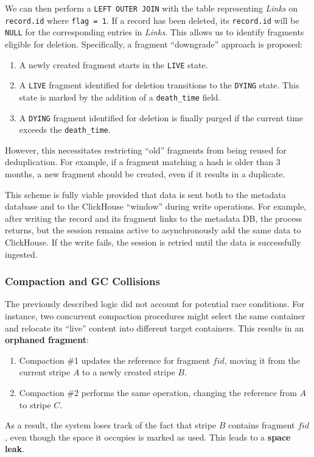 \documentclass[a4paper,12pt]{article}
\begin{document}
    \smallskip
    We can then perform a \texttt{LEFT OUTER JOIN} with the table representing \textit{Links} on \texttt{record.id} where \texttt{flag = 1}. If a record has been deleted, its \texttt{record.id} will be \texttt{NULL} for the corresponding entries in \textit{Links}. This allows us to identify fragments eligible for deletion. Specifically, a fragment \enquote{downgrade} approach is proposed:

    \begin{enumerate}
        \item A newly created fragment starts in the \texttt{LIVE} state.
        \item A \texttt{LIVE} fragment identified for deletion transitions to the \texttt{DYING} state. This state is marked by the addition of a \texttt{death\_time} field.
        \item A \texttt{DYING} fragment identified for deletion is finally purged if the current time exceeds the \texttt{death\_time}.
    \end{enumerate}

    \smallskip
    However, this necessitates restricting \enquote{old} fragments from being reused for deduplication. For example, if a fragment matching a hash is older than 3 months, a new fragment should be created, even if it results in a duplicate.

    \bigskip
    This scheme is fully viable provided that data is sent both to the metadata database and to the ClickHouse \enquote{window} during write operations. For example, after writing the record and its fragment links to the metadata DB, the process returns, but the session remains active to asynchronously add the same data to ClickHouse. If the write fails, the session is retried until the data is successfully ingested.

    \subsubsection{Compaction and GC Collisions}

    The previously described logic did not account for potential race conditions. For instance, two concurrent compaction procedures might select the same container and relocate its \enquote{live} content into different target containers. This results in an \textbf{orphaned fragment}:
    \begin{enumerate}
        \item Compaction \#1 updates the reference for fragment $fid$, moving it from the current stripe $A$ to a newly created stripe $B$.
        \item Compaction \#2 performs the same operation, changing the reference from $A$ to stripe $C$.
    \end{enumerate}
    As a result, the system loses track of the fact that stripe $B$ contains fragment $fid$, even though the space it occupies is marked as used. This leads to a \textbf{space leak}.
\end{document}
